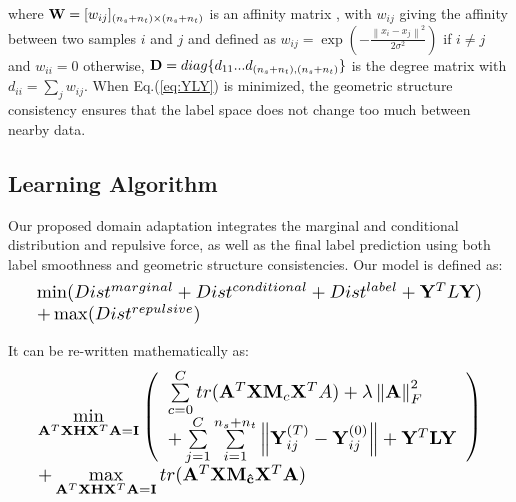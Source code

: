 \documentclass[10pt,twocolumn,letterpaper]{article}
\begin{document}
\begin{CJK*}{UTF8}{gkai}
where  ${\bf{W}} = {[{w_{ij}}]_{({n_s} + {n_t}) \times ({n_s} + {n_t})}}$ is an affinity matrix \cite{NIPS2001_2092}, with   ${w_{ij}}$ giving the affinity between two samples $i$ and $j$ and  defined as ${w_{ij}} = \exp ( - \frac{{{{\left\| {{x_i} - {x_j}} \right\|}^2}}}{{2{\sigma ^2}}})$ if $i \ne j$ and ${w_{ii}} = 0$ otherwise, ${\bf{D}} = diag\{ {d_{11}}...{d_{({n_s} + {n_t}),({n_s} + {n_t})}}\} $ is the degree matrix with ${d_{ii}} = \sum\nolimits_j {{w_{ij}}} $. When Eq.(\ref{eq:YLY}) is minimized, the geometric structure consistency ensures that the label space does not change too much between nearby data.

\subsection{Learning Algorithm}
Our proposed domain adaptation integrates the marginal and conditional distribution and repulsive force, as well as the final label prediction using both label smoothness and geometric structure consistencies. Our model is defined as:
\begin{equation}\label{eq:ours_physical}
		\resizebox{0.96\hsize}{!}{%
	$\begin{array}{*{20}{l}}
		{\min (Dis{t^{marginal}} + Dis{t^{conditional}} + Dis{t^{label}} + {{\bf{Y}}^T}L{\bf{Y}})}\\ + 
		\max (Dist^{repulsive})
	\end{array}$}
\end{equation}

It can be re-written mathematically as:
\begin{equation}\label{eq:ours_math}
	\resizebox{1\hsize}{!}{%
$\begin{array}{*{20}{l}}
{\begin{array}{*{20}{l}}
	{\mathop {\min }\limits_{{{\bf{A}}^T}{\bf{XH}}{{\bf{X}}^T}{\bf{A}} = {\bf{I}}} \left( {\begin{array}{*{20}{l}}
			{\sum\limits_{c = 0}^C {tr({{\bf{A}}^T}{\bf{X}}{{\bf{M}}_c}{{\bf{X}}^T}A)}  + \lambda \left\| {\bf{A}} \right\|_F^2}\\
			{ + \sum\limits_{j = 1}^C {\sum\limits_{i = 1}^{{n_s} + {n_t}} {\left\| {{\bf{Y}}_{ij}^{(T)} - {\bf{Y}}_{ij}^{(0)}} \right\|} }  + {{\bf{Y}}^T}{\bf{LY}}}
			\end{array}} \right)}\\
	{ + \mathop {\max }\limits_{{{\bf{A}}^T}{\bf{XH}}{{\bf{X}}^T}{\bf{A}} = {\bf{I}}} tr({{\bf{A}}^T}{\bf{X}}{{\bf{M}}_{{\bf{\hat c}}}}{{\bf{X}}^T}{\bf{A}})}
	\end{array}}
\end{array}$}
\end{equation}


\end{CJK*}
\end{document}
